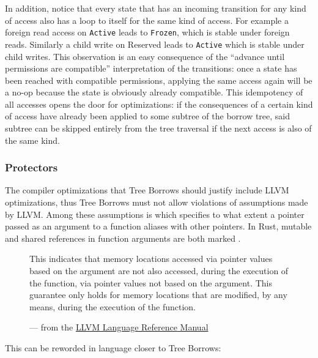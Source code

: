 \documentclass[a4paper,11pt]{article}
\theoremstyle{plain}
\theoremstyle{definition}
\theoremstyle{remark}
\newcommand{\tcode}[1]{\rstinline{#1}}
\newcommand{\tperm}[1]{\texttt{#1}}
\begin{document}
In addition, notice that every state that has an incoming transition for any kind of
access also has a loop to itself for the same kind of access. For example a foreign read
access on \tperm{Active} leads to \tperm{Frozen}, which is stable under foreign reads. Similarly
a child write on Reserved leads to \tperm{Active} which is stable under child writes.
This observation is an easy consequence of the ``advance until permissions are compatible''
interpretation of the transitions: once a state has been reached with compatible
permissions, applying the same access again will be a no-op because the state
is obviously already compatible. This idempotency of all accesses opens the door
for optimizations: if the consequences of a certain kind of access have already
been applied to some subtree of the borrow tree, said subtree can be skipped entirely
from the tree traversal if the next access is also of the same kind.


\subsubsection{Protectors}
\label{sec:need-protect}

The compiler optimizations that Tree Borrows should justify include LLVM optimizations,
thus Tree Borrows must not allow violations of assumptions made by LLVM. Among these
assumptions is \tcode{noalias} which specifies to what extent a pointer passed as an
argument to a function aliases with other pointers. In Rust, mutable and shared
references in function arguments are both marked \tcode{noalias}.

\begin{figure}[h]
    \centering
    \begin{minipage}{0.8\textwidth}
        \tcode{noalias}

        This indicates that memory locations accessed via pointer values based on the argument
        are not also accessed, during the execution of the function, via pointer values not based on
        the argument. This guarantee only holds for memory locations that are modified,
        by any means, during the execution of the function.

        --- from the \href{https://llvm.org/docs/LangRef.html}{LLVM Language Reference Manual}
    \end{minipage}
\end{figure}

This can be reworded in language closer to Tree Borrows:
\end{document}
